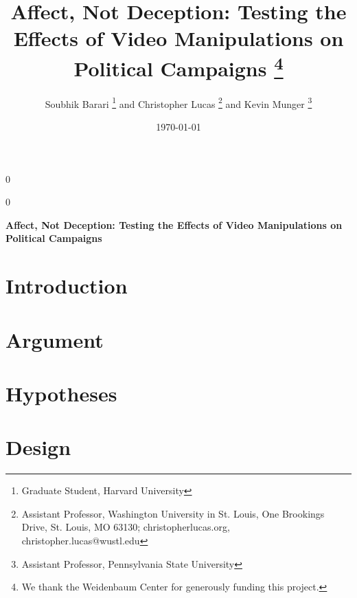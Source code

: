 \documentclass[12pt]{article}
\newcommand{\blind}{0}
\begin{document}
\def\spacingset#1{\renewcommand{\baselinestretch}%
{#1}\small\normalsize} \spacingset{1}


\date{\today}

\blind { \title{\bf Affect, Not Deception: Testing the Effects of Video Manipulations on Political Campaigns
    \thanks{We thank the Weidenbaum Center for generously funding this project.}}
  \author{Soubhik Barari
    \thanks{Graduate Student, Harvard University}
    and
    Christopher Lucas
    \thanks{Assistant Professor, Washington
      University in St. Louis, One Brookings Drive, St. Louis, MO
      63130; christopherlucas.org, christopher.lucas@wustl.edu}
    and
    Kevin Munger
    \thanks{Assistant Professor, Pennsylvania State University}
  }
  \maketitle } \fi

\blind
{
  \bigskip
  \bigskip
  \bigskip
  \begin{center}
    {\LARGE\bf Affect, Not Deception: Testing the Effects of Video Manipulations on Political Campaigns}
\end{center}
  \medskip
} \fi

\bigskip
\begin{abstract}

\end{abstract}

\vspace{1em}
\begin{center}
\end{center}

\newpage
\spacingset{2} 

\section{Introduction}


\section{Argument}


\section{Hypotheses}

  
\section{Design}


\printbibliography
\end{document}
